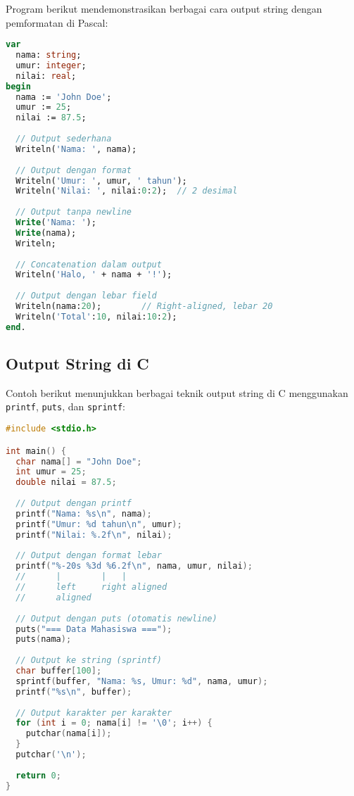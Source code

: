 \documentclass[../main.tex]{subfiles}
\begin{document}
Program berikut mendemonstrasikan berbagai cara output string dengan pemformatan di Pascal:

\begin{lstlisting}[language=Pascal, caption={Output string di Pascal}]
var
  nama: string;
  umur: integer;
  nilai: real;
begin
  nama := 'John Doe';
  umur := 25;
  nilai := 87.5;
  
  // Output sederhana
  Writeln('Nama: ', nama);
  
  // Output dengan format
  Writeln('Umur: ', umur, ' tahun');
  Writeln('Nilai: ', nilai:0:2);  // 2 desimal
  
  // Output tanpa newline
  Write('Nama: ');
  Write(nama);
  Writeln;
  
  // Concatenation dalam output
  Writeln('Halo, ' + nama + '!');
  
  // Output dengan lebar field
  Writeln(nama:20);        // Right-aligned, lebar 20
  Writeln('Total':10, nilai:10:2);
end.
\end{lstlisting}

\subsection{Output String di C}

Contoh berikut menunjukkan berbagai teknik output string di C menggunakan \texttt{printf}, \texttt{puts}, dan \texttt{sprintf}:

\begin{lstlisting}[language=C, caption={Output string di C}]
#include <stdio.h>

int main() {
  char nama[] = "John Doe";
  int umur = 25;
  double nilai = 87.5;
  
  // Output dengan printf
  printf("Nama: %s\n", nama);
  printf("Umur: %d tahun\n", umur);
  printf("Nilai: %.2f\n", nilai);
  
  // Output dengan format lebar
  printf("%-20s %3d %6.2f\n", nama, umur, nilai);
  //      |        |   |
  //      left     right aligned
  //      aligned  
  
  // Output dengan puts (otomatis newline)
  puts("=== Data Mahasiswa ===");
  puts(nama);
  
  // Output ke string (sprintf)
  char buffer[100];
  sprintf(buffer, "Nama: %s, Umur: %d", nama, umur);
  printf("%s\n", buffer);
  
  // Output karakter per karakter
  for (int i = 0; nama[i] != '\0'; i++) {
    putchar(nama[i]);
  }
  putchar('\n');
  
  return 0;
}
\end{lstlisting}
\end{document}
